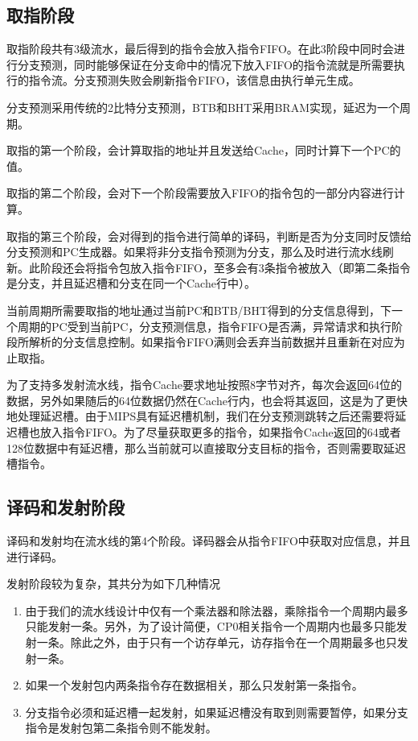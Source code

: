 \subsection{取指阶段}
取指阶段共有3级流水，最后得到的指令会放入指令FIFO。在此3阶段中同时会进行分支预测，同时能够保证在分支命中的情况下放入FIFO的指令流就是所需要执行的指令流。分支预测失败会刷新指令FIFO，该信息由执行单元生成。

分支预测采用传统的2比特分支预测，BTB和BHT采用BRAM实现，延迟为一个周期。

取指的第一个阶段，会计算取指的地址并且发送给Cache，同时计算下一个PC的值。

取指的第二个阶段，会对下一个阶段需要放入FIFO的指令包的一部分内容进行计算。

取指的第三个阶段，会对得到的指令进行简单的译码，判断是否为分支同时反馈给分支预测和PC生成器。如果将非分支指令预测为分支，那么及时进行流水线刷新。此阶段还会将指令包放入指令FIFO，至多会有3条指令被放入（即第二条指令是分支，并且延迟槽和分支在同一个Cache行中）。

当前周期所需要取指的地址通过当前PC和BTB/BHT得到的分支信息得到，下一个周期的PC受到当前PC，分支预测信息，指令FIFO是否满，异常请求和执行阶段所解析的分支信息控制。如果指令FIFO满则会丢弃当前数据并且重新在对应为止取指。

为了支持多发射流水线，指令Cache要求地址按照8字节对齐，每次会返回64位的数据，另外如果随后的64位数据仍然在Cache行内，也会将其返回，这是为了更快地处理延迟槽。由于MIPS具有延迟槽机制，我们在分支预测跳转之后还需要将延迟槽也放入指令FIFO。为了尽量获取更多的指令，如果指令Cache返回的64或者128位数据中有延迟槽，那么当前就可以直接取分支目标的指令，否则需要取延迟槽指令。

\subsection{译码和发射阶段}
译码和发射均在流水线的第4个阶段。译码器会从指令FIFO中获取对应信息，并且进行译码。

发射阶段较为复杂，其共分为如下几种情况
\begin{enumerate}
    \item 由于我们的流水线设计中仅有一个乘法器和除法器，乘除指令一个周期内最多只能发射一条。另外，为了设计简便，CP0相关指令一个周期内也最多只能发射一条。除此之外，由于只有一个访存单元，访存指令在一个周期最多也只发射一条。
    \item 如果一个发射包内两条指令存在数据相关，那么只发射第一条指令。
    \item 分支指令必须和延迟槽一起发射，如果延迟槽没有取到则需要暂停，如果分支指令是发射包第二条指令则不能发射。
\end{enumerate}

